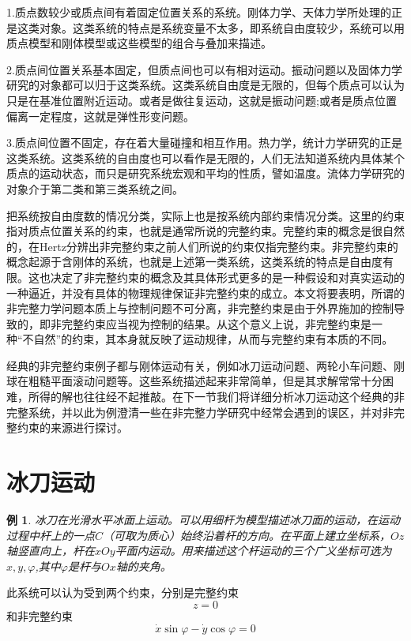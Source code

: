 \documentclass[A4,twoside]{ctexart}
\begin{document}
1.质点数较少或质点间有着固定位置关系的系统。刚体力学、天体力学所处理的正是这类对象。这类系统的特点是系统变量不太多，即系统自由度较少，系统可以用质点模型和刚体模型或这些模型的组合与叠加来描述。

2.质点间位置关系基本固定，但质点间也可以有相对运动。振动问题以及固体力学研究的对象都可以归于这类系统。这类系统自由度是无限的，但每个质点可以认为只是在基准位置附近运动。或者是做往复运动，这就是振动问题;或者是质点位置偏离一定程度，这就是弹性形变问题。

3.质点间位置不固定，存在着大量碰撞和相互作用。热力学，统计力学研究的正是这类系统。这类系统的自由度也可以看作是无限的，人们无法知道系统内具体某个质点的运动状态，而只是研究系统宏观和平均的性质，譬如温度。流体力学研究的对象介于第二类和第三类系统之间。

把系统按自由度数的情况分类，实际上也是按系统内部约束情况分类。这里的约束指对质点位置关系的约束，也就是通常所说的完整约束。完整约束的概念是很自然的，在Hertz分辨出非完整约束之前人们所说的约束仅指完整约束。非完整约束的概念起源于含刚体的系统，也就是上述第一类系统，这类系统的特点是自由度有限。这也决定了非完整约束的概念及其具体形式更多的是一种假设和对真实运动的一种逼近，并没有具体的物理规律保证非完整约束的成立。本文将要表明，所谓的非完整力学问题本质上与控制问题不可分离，非完整约束是由于外界施加的控制导致的，即非完整约束应当视为控制的结果。从这个意义上说，非完整约束是一种“不自然”的约束，其本身就反映了运动规律，从而与完整约束有本质的不同。

经典的非完整约束例子都与刚体运动有关，例如冰刀运动问题、两轮小车问题、刚球在粗糙平面滚动问题等。这些系统描述起来非常简单，但是其求解常常十分困难，所得的解也往往经不起推敲。在下一节我们将详细分析冰刀运动这个经典的非完整系统，并以此为例澄清一些在非完整力学研究中经常会遇到的误区，并对非完整约束的来源进行探讨。

\section{冰刀运动}
\label{sec:ice}
\newtheorem{example}{例}

\begin{example}
  冰刀在光滑水平冰面上运动。可以用细杆为模型描述冰刀面的运动，在运动过程中杆上的一点$C$（可取为质心）始终沿着杆的方向。在平面上建立坐标系，$Oz$轴竖直向上，杆在$xOy$平面内运动。用来描述这个杆运动的三个广义坐标可选为$x,y,\varphi$,其中$\varphi$是杆与$Ox$轴的夹角。
\end{example}

此系统可以认为受到两个约束，分别是完整约束
\begin{equation}
  \label{eq:ice1}
  z = 0
\end{equation}
和非完整约束
\begin{equation}
  \label{eq:ice2}
  \dot{x} \sin\varphi - \dot{y} \cos\varphi = 0
\end{equation}
\end{document}
